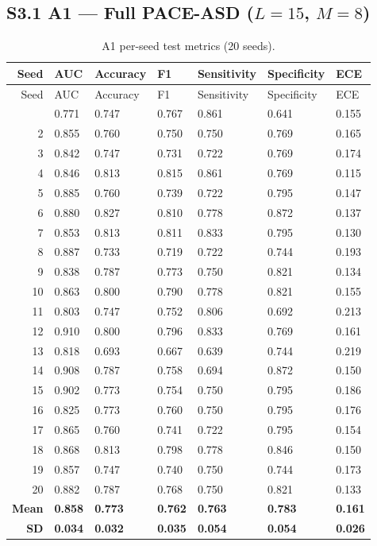 \documentclass[12pt,a4paper]{article}
\begin{document}
\subsection{S3.1 A1 --- Full PACE-ASD ($L=15$, $M=8$)}

\begin{longtable}{@{}rllllll@{}}
\caption{A1 per-seed test metrics (20 seeds).} \\
\toprule
Seed & AUC & Accuracy & F1 & Sensitivity & Specificity & ECE \\
\midrule
\endfirsthead
\toprule
Seed & AUC & Accuracy & F1 & Sensitivity & Specificity & ECE \\
\midrule
\endhead
\bottomrule
\endfoot
1  & 0.771 & 0.747 & 0.767 & 0.861 & 0.641 & 0.155 \\
2  & 0.855 & 0.760 & 0.750 & 0.750 & 0.769 & 0.165 \\
3  & 0.842 & 0.747 & 0.731 & 0.722 & 0.769 & 0.174 \\
4  & 0.846 & 0.813 & 0.815 & 0.861 & 0.769 & 0.115 \\
5  & 0.885 & 0.760 & 0.739 & 0.722 & 0.795 & 0.147 \\
6  & 0.880 & 0.827 & 0.810 & 0.778 & 0.872 & 0.137 \\
7  & 0.853 & 0.813 & 0.811 & 0.833 & 0.795 & 0.130 \\
8  & 0.887 & 0.733 & 0.719 & 0.722 & 0.744 & 0.193 \\
9  & 0.838 & 0.787 & 0.773 & 0.750 & 0.821 & 0.134 \\
10 & 0.863 & 0.800 & 0.790 & 0.778 & 0.821 & 0.155 \\
11 & 0.803 & 0.747 & 0.752 & 0.806 & 0.692 & 0.213 \\
12 & 0.910 & 0.800 & 0.796 & 0.833 & 0.769 & 0.161 \\
13 & 0.818 & 0.693 & 0.667 & 0.639 & 0.744 & 0.219 \\
14 & 0.908 & 0.787 & 0.758 & 0.694 & 0.872 & 0.150 \\
15 & 0.902 & 0.773 & 0.754 & 0.750 & 0.795 & 0.186 \\
16 & 0.825 & 0.773 & 0.760 & 0.750 & 0.795 & 0.176 \\
17 & 0.865 & 0.760 & 0.741 & 0.722 & 0.795 & 0.154 \\
18 & 0.868 & 0.813 & 0.798 & 0.778 & 0.846 & 0.150 \\
19 & 0.857 & 0.747 & 0.740 & 0.750 & 0.744 & 0.173 \\
20 & 0.882 & 0.787 & 0.768 & 0.750 & 0.821 & 0.133 \\
\midrule
\textbf{Mean} & \textbf{0.858} & \textbf{0.773} & \textbf{0.762} & \textbf{0.763} & \textbf{0.783} & \textbf{0.161} \\
\textbf{SD}   & \textbf{0.034} & \textbf{0.032} & \textbf{0.035} & \textbf{0.054} & \textbf{0.054} & \textbf{0.026} \\
\end{longtable}
\end{document}

